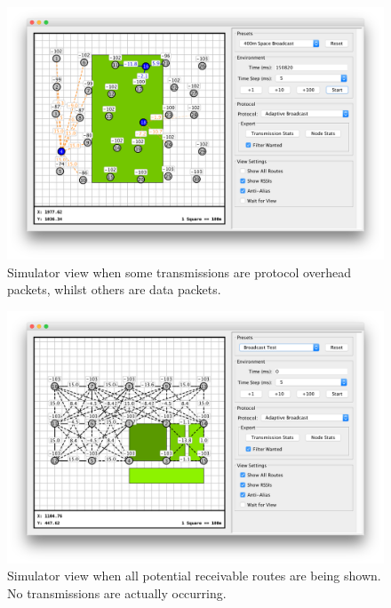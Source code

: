 \begin{figure}[H]
    \centering
   	\includegraphics[width=\textwidth]{Figures/simulator_overhead}
    \caption[Simulator view with data and overhead]{
    	Simulator view when some transmissions are protocol overhead packets, whilst others are data packets.
    \label{fig:sim_view_overhead}
    }
\end{figure}

\begin{figure}[H]
    \centering
   	\includegraphics[width=\textwidth]{Figures/simulator_all_routes}
    \caption[Simulator view with all routes shown]{
    	Simulator view when all potential receivable routes are being shown. No transmissions are actually occurring.
   	\label{fig:sim_view_all_routes}
    }
\end{figure}